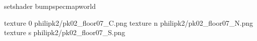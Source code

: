 setshader bumpspecmapworld

texture 0 philipk2/pk02_floor07_C.png
texture n philipk2/pk02_floor07_N.png
texture s philipk2/pk02_floor07_S.png

